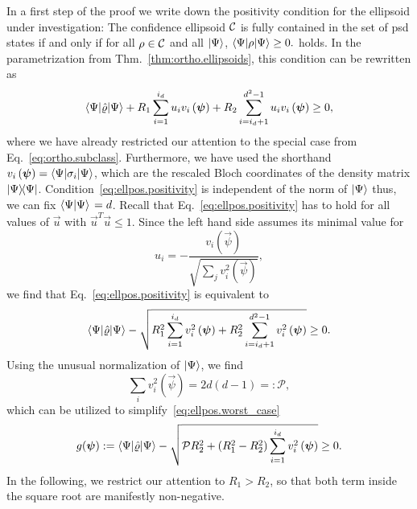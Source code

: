 In a first step of the proof we write down the positivity condition for the ellipsoid under investigation:
The confidence ellipsoid $\mathcal{C}$ is fully contained in the set of psd states if and only if for all $\rho \in \mathcal{C}$ and all $\ket{\Psi}$,
\(
  \bra{\Psi} \rho \ket{\Psi} \ge 0.
\)
holds.
In the parametrization from Thm.~\ref{thm:ortho.ellipsoids}, this condition can be rewritten as
\begin{equation}
  \bra{\Psi}\estim{\varrho} \ket{\Psi} +R_{1}\sum_{i=1}^{i_{d}}u_{i}v_{i}\left(\vec\psi\right)+R_{2}\sum_{i=i_{d}+1}^{d^{2}-1}u_{i}v_{i}\left(\vec\psi\right)\geq0,
  \label{eq:ellpos.positivity}
\end{equation}
where we have already restricted our attention to the special case from Eq.~\eqref{eq:ortho.subclass}.
Furthermore, we have used the shorthand $v_{i}\left(\vec\psi\right)=\bra{\Psi}\sigma_{i} \ket{\Psi} $, which are the rescaled Bloch coordinates of the density matrix $\ket{\Psi} \bra{\Psi}$.
Condition~\eqref{eq:ellpos.positivity} is independent of the norm of $\ket{\Psi}$ thus, we can fix $\left\langle \Psi \ket{\Psi} \right. = d$.
Recall that Eq.~\eqref{eq:ellpos.positivity} has to hold for all values of $\vec u$ with $\vec u^T \vec u \le 1$.
Since the left hand side assumes its minimal value for
\begin{equation}
  u_{i} = -\frac{v_{i}\left(\vec\psi\right)}{\sqrt{\sum_{j}v_{i}^{2}\left(\vec\psi\right)}},
\end{equation}
we find that Eq.~\eqref{eq:ellpos.positivity} is equivalent to
\begin{equation}
 \bra{\Psi}\estim{\varrho} \ket{\Psi} -\sqrt{R_{1}^{2}\sum_{i=1}^{i_{d}}v_{i}^{2}\left(\vec\psi\right)+R_{2}^{2}\sum_{i=i_{d}+1}^{d^{2}-1}v_{i}^{2}\left(\vec\psi\right)}\geq0.
  \label{eq:ellpos.worst_case}
\end{equation}
Using the unusual normalization of $\ket\Psi$, we find
\begin{equation}
  \sum_{i}v_{i}^{2}\left(\vec\psi\right)=2 d\left(d-1\right) =: \mathcal{P},
\end{equation}
which can be utilized to simplify~\eqref{eq:ellpos.worst_case}
\begin{equation}
 g(\vec\psi) := \bra{\Psi}\estim{\varrho} \ket{\Psi} -\sqrt{\mathcal{P}R_{2}^{2}+\left(R_{1}^{2}-R_{2}^{2}\right)\sum_{i=1}^{i_{d}}v_{i}^{2}\left(\vec\psi\right)}\geq0.
  \label{eq:ellpos.major}
\end{equation}
In the following, we restrict our attention to  $R_{1}>R_{2}$, so that both term inside the square root are manifestly non-negative.\\

